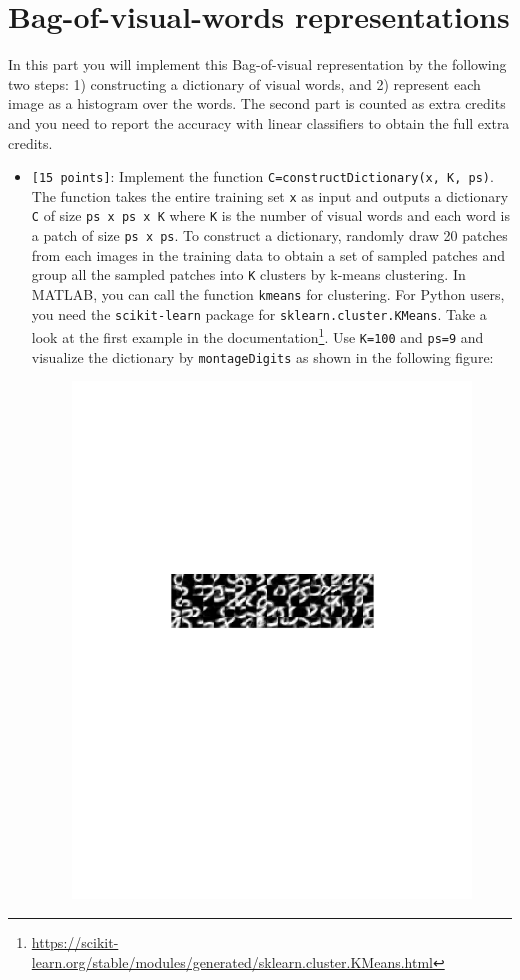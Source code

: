 \documentclass[10pt,letterpaper]{article}
\newcommand{\cmd}[1] {{\color{blue}\texttt{#1}}}
\begin{document}
\section{Bag-of-visual-words representations}
In this part you will implement this Bag-of-visual representation by the following two steps: 1) constructing a dictionary of visual words, and 2) represent each image as a histogram over the words. The second part is counted as extra credits and you need to report the accuracy with linear classifiers to obtain the full extra credits.
\begin{itemize}
\item \cmd{[15 points]}: Implement the function \cmd{C=constructDictionary(x, K, ps)}. The function takes the entire training set \cmd{x} as input and outputs a dictionary \cmd{C} of size \cmd{ps x ps x K} where \cmd{K} is the number of visual words and each word is a patch of size \cmd{ps x ps}. To construct a dictionary, randomly draw 20 patches from each images in the training data to obtain a set of sampled patches and group all the sampled patches into \cmd{K} clusters by k-means clustering. In MATLAB, you can call the function \cmd{kmeans} for clustering. For Python users, you need the \cmd{scikit-learn} package for \cmd{sklearn.cluster.KMeans}. Take a look at the first example in the documentation\footnote{\url{https://scikit-learn.org/stable/modules/generated/sklearn.cluster.KMeans.html}}. Use \cmd{K=100} and \cmd{ps=9} and visualize the dictionary by \cmd{montageDigits} as shown in the following figure:
\begin{figure}[h]
\centering
\includegraphics[trim={0cm 14cm 0cm 10cm},clip, width=\linewidth]{dictionary.pdf}
\end{figure}


\end{itemize}
\end{document}
